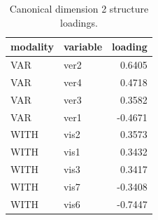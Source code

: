 \begin{table}
\caption{Canonical dimension 2 structure loadings.}
\label{tab:cca_dimension_2_loadings}
\begin{tabular}{llr}
\toprule
modality & variable & loading \\
\midrule
VAR & ver2 & 0.6405 \\
VAR & ver4 & 0.4718 \\
VAR & ver3 & 0.3582 \\
VAR & ver1 & -0.4671 \\
WITH & vis2 & 0.3573 \\
WITH & vis1 & 0.3432 \\
WITH & vis3 & 0.3417 \\
WITH & vis7 & -0.3408 \\
WITH & vis6 & -0.7447 \\
\bottomrule
\end{tabular}
\end{table}
